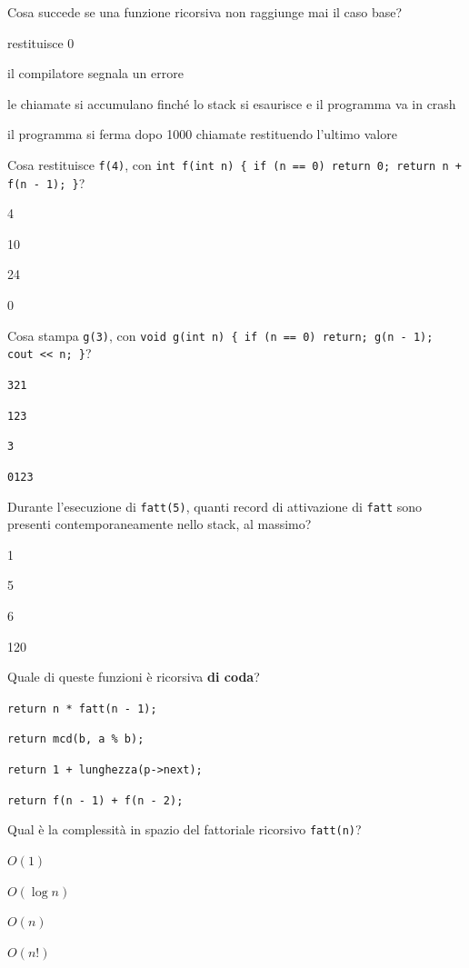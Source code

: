 \begin{quiz}{Cosa succede se una funzione ricorsiva non raggiunge mai il caso base?}
  \item restituisce 0
  \item il compilatore segnala un errore
  \item le chiamate si accumulano finché lo stack si esaurisce e il programma va in crash
  \item il programma si ferma dopo 1000 chiamate restituendo l'ultimo valore
\end{quiz}

\begin{quiz}{Cosa restituisce \texttt{f(4)}, con \texttt{int f(int n) \{ if (n == 0) return 0; return n + f(n - 1); \}}?}
  \item 4
  \item 10
  \item 24
  \item 0
\end{quiz}

\begin{quiz}{Cosa stampa \texttt{g(3)}, con \texttt{void g(int n) \{ if (n == 0) return; g(n - 1); cout << n; \}}?}
  \item \texttt{321}
  \item \texttt{123}
  \item \texttt{3}
  \item \texttt{0123}
\end{quiz}

\begin{quiz}{Durante l'esecuzione di \texttt{fatt(5)}, quanti record di attivazione di \texttt{fatt} sono presenti contemporaneamente nello stack, al massimo?}
  \item 1
  \item 5
  \item 6
  \item 120
\end{quiz}

\begin{quiz}{Quale di queste funzioni è ricorsiva \textbf{di coda}?}
  \item \texttt{return n * fatt(n - 1);}
  \item \texttt{return mcd(b, a \% b);}
  \item \texttt{return 1 + lunghezza(p->next);}
  \item \texttt{return f(n - 1) + f(n - 2);}
\end{quiz}

\begin{quiz}{Qual è la complessità in spazio del fattoriale ricorsivo \texttt{fatt(n)}?}
  \item $O(1)$
  \item $O(\log n)$
  \item $O(n)$
  \item $O(n!)$
\end{quiz}

